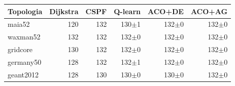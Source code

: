 \begin{tabular}{@{}lrrrrr@{}}
\toprule
Topologia & Dijkstra & CSPF & Q-learn & ACO+DE & ACO+AG\\
\midrule
maia52 & 120 & 132 & 130$\pm$1 & 132$\pm$0 & 132$\pm$0\\
waxman52 & 132 & 132 & 132$\pm$0 & 132$\pm$0 & 132$\pm$0\\
gridcore & 130 & 132 & 132$\pm$0 & 132$\pm$0 & 132$\pm$0\\
germany50 & 128 & 132 & 132$\pm$1 & 132$\pm$0 & 132$\pm$0\\
geant2012 & 128 & 130 & 130$\pm$0 & 130$\pm$0 & 132$\pm$0\\
\bottomrule
\end{tabular}
